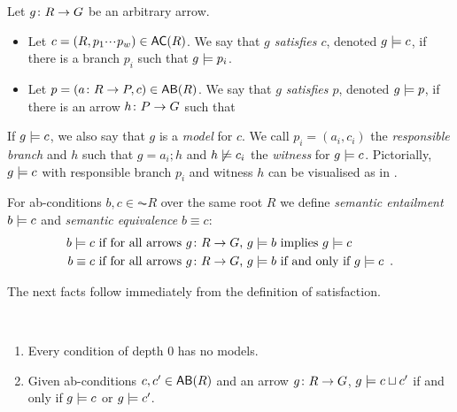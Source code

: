 \begin{definition}\label{def:ab-satisfaction}%
Let $g\colon R\rightarrow G$ be an arbitrary arrow.
\begin{itemize}[defsep]
\item Let $c=(R,p_1\ccdots p_w)\in \AC R$. We say that \emph{$g$ satisfies $c$}, denoted $g\models c$, if there is a branch $p_i$ such that $g\models p_i$.

\item Let $p=(a\of R\to P,c)\in \AB R$. We say that \emph{$g$ satisfies $p$}, denoted $g\models p$, if  there is an arrow $h\colon P\rightarrow G$ such that
\end{itemize}
\end{definition}
%
If $g\models c$, we also say that $g$ is a \emph{model} for $c$. We call $p_i=(a_i,c_i)$ the \emph{responsible branch} and $h$ such that $g=a_i;h$ and $h\not\models c_i$ the \emph{witness} for $g\models c$. Pictorially, $g\models c$ with responsible branch $p_i$ and witness $h$ can be visualised as in .

\begin{definition}\label{def:entailment}
For ab-conditions $b,c\in \AC R$ over the same root $R$ we  define \emph{semantic entailment} $b\models c$ and \emph{semantic equivalence} $b\equiv c$:
%
\begin{align*}
b \models c & \text{ if for all arrows $g\colon R\rightarrow G$, } g\models b \text{ implies } g\models c \\
b \equiv c & \text{ if for all arrows $g\colon R\rightarrow G$, } g\models b \text{ if and only if } g\models c \enspace. 
\end{align*}
\end{definition}
%
The next facts follow immediately from the definition of satisfaction.
%
\begin{fact}\label{fact:satisfaction}~
\begin{enumerate}[defsep]
\item Every condition of depth 0 has no models.
    
\item
Given ab-conditions $c, c' \in \AB{R}$ and an arrow $g\colon R \rightarrow G$, $g \models c\sqcup c'$ if and only if $g\models c $ or $g\models c'$.
\end{enumerate}
\end{fact}

